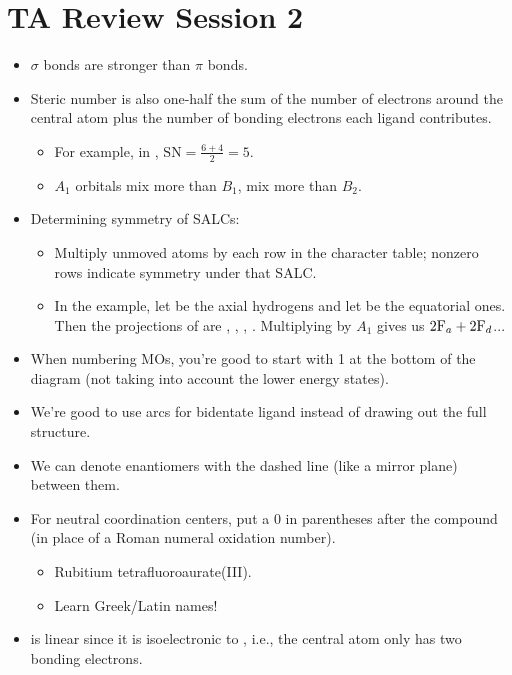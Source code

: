\documentclass[../notes.tex]{subfiles}
\begin{document}
\section{TA Review Session 2}
\begin{itemize}
    \item {}$\sigma$ bonds are stronger than $\pi$ bonds.
    \item Steric number is also one-half the sum of the number of electrons around the central atom plus the number of bonding electrons each ligand contributes.
    \begin{itemize}
        \item For example, in , $\text{SN}=\frac{6+4}{2}=5$.
        \item $A_1$ orbitals mix more than $B_1$, mix more than $B_2$.
    \end{itemize}
    \item Determining symmetry of SALCs:
    \begin{itemize}
        \item Multiply unmoved atoms by each row in the character table; nonzero rows indicate symmetry under that SALC.
        \item In the  example, let  be the axial hydrogens and let  be the equatorial ones. Then the projections of  are , , , . Multiplying by $A_1$ gives us $2\ce{F}_a+2\ce{F}_d$...
    \end{itemize}
    \item When numbering MOs, you're good to start with 1 at the bottom of the diagram (not taking into account the lower energy states).
    \item We're good to use arcs for bidentate ligand instead of drawing out the full structure.
    \item We can denote enantiomers with the dashed line (like a mirror plane) between them.
    \item For neutral coordination centers, put a 0 in parentheses after the compound (in place of a Roman numeral oxidation number).
    \begin{itemize}
        \item Rubitium tetrafluoroaurate(III).
        \item Learn Greek/Latin names!
    \end{itemize}
    \item {} is linear since it is isoelectronic to , i.e., the central atom only has two bonding electrons.

\end{itemize}
\end{document}
